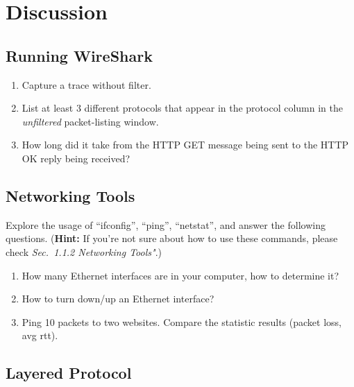 \section{Discussion}

\subsection{Running WireShark}
\label{Dis_run_wireshark}

\begin{enumerate}

\item Capture a trace without filter.

\item List at least 3 different protocols that appear in the protocol
  column in the {\em unfiltered} packet-listing window.

\item How long did it take from the HTTP GET message being sent
  to the HTTP OK reply being received?

\end{enumerate}

\subsection{Networking Tools}

Explore the usage of ``ifconfig'', ``ping'', ``netstat'', and answer the following questions. (\textbf{Hint:} If you're not sure about how to use these commands, please check \textsl{Sec.~1.1.2 Networking Tools"}.)

\begin{enumerate}

\item  How many Ethernet interfaces are in your computer, how to determine it?

\item How to turn down/up an Ethernet interface?

\item Ping 10 packets to two websites. Compare the statistic results (packet loss, avg rtt).

\end{enumerate}

\subsection{Layered Protocol}

